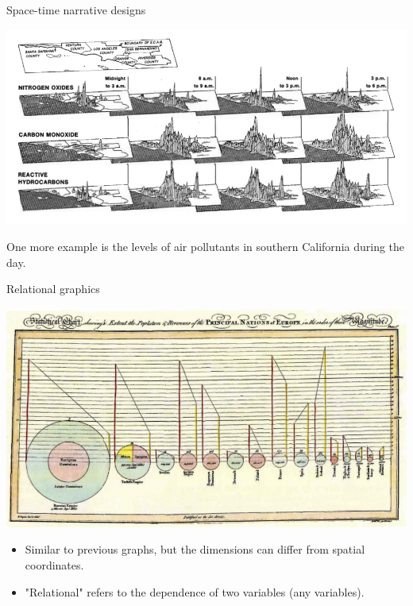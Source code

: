 \documentclass[
  ignorenonframetext,
]{beamer}
\begin{document}
\begin{frame}{Space-time narrative designs}
\protect\hypertarget{space-time-narrative-designs-2}{}
\begin{minipage}{1\textwidth}
\centering
\includegraphics[width=\textwidth]{excellence_figs/fig_23.png}
\end{minipage}
\hfill
\begin{minipage}{1\textwidth}
\footnotesize
\vspace{3mm}
One more example is the levels of air pollutants in southern California during the day.
\end{minipage}
\end{frame}

\begin{frame}{Relational graphics}
\protect\hypertarget{relational-graphics}{}
\begin{minipage}{1\textwidth}
\centering
\includegraphics[width=\textwidth]{excellence_figs/fig_24.png}
\end{minipage}
\hfill \vspace{3mm}
\begin{minipage}{1\textwidth}
\footnotesize
\begin{itemize}
  \item Similar to previous graphs, but the dimensions can differ from spatial coordinates.
  \item "Relational" refers to the dependence of two variables (any variables).
\end{itemize}
\end{minipage}
\end{frame}
\end{document}
